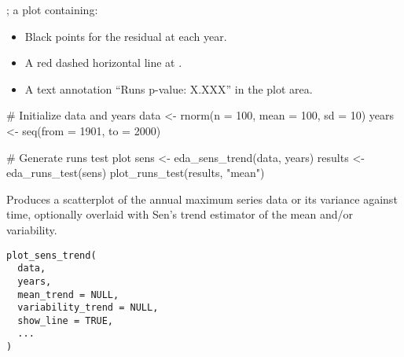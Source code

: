 \documentclass[a4paper]{book}
\begin{document}
%
\begin{Value}
; a plot containing:
\begin{itemize}

\item{} Black points for the residual at each year.
\item{} A red dashed horizontal line at .
\item{} A text annotation “Runs p-value: X.XXX” in the plot area.

\end{itemize}

\end{Value}
%
\begin{SeeAlso}
\end{SeeAlso}
%
\begin{Examples}
\begin{ExampleCode}
# Initialize data and years
data <- rnorm(n = 100, mean = 100, sd = 10)
years <- seq(from = 1901, to = 2000)

# Generate runs test plot 
sens <- eda_sens_trend(data, years)
results <- eda_runs_test(sens)
plot_runs_test(results, "mean")

\end{ExampleCode}
\end{Examples}
%
\begin{Description}
Produces a scatterplot of the annual maximum series data or its variance
against time, optionally overlaid with Sen’s trend estimator of the mean and/or
variability.
\end{Description}
%
\begin{Usage}
\begin{verbatim}
plot_sens_trend(
  data,
  years,
  mean_trend = NULL,
  variability_trend = NULL,
  show_line = TRUE,
  ...
)
\end{verbatim}
\end{Usage}
%
\end{document}
